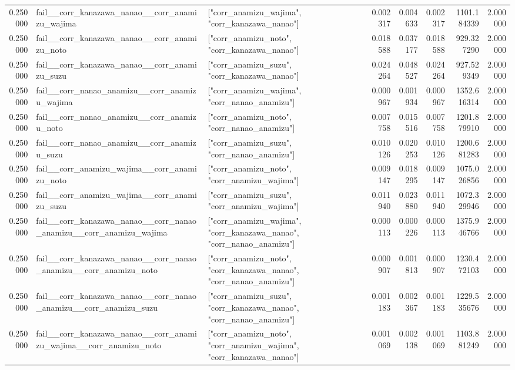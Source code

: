 \begin{tabular}{rllrrrrr}
0.250000 & fail\_\_corr\_kanazawa\_nanao\_\_corr\_anamizu\_wajima & ["corr\_anamizu\_wajima", "corr\_kanazawa\_nanao"] & 0.002317 & 0.004633 & 0.002317 & 1101.184339 & 2.000000 \\
0.250000 & fail\_\_corr\_kanazawa\_nanao\_\_corr\_anamizu\_noto & ["corr\_anamizu\_noto", "corr\_kanazawa\_nanao"] & 0.018588 & 0.037177 & 0.018588 & 929.327290 & 2.000000 \\
0.250000 & fail\_\_corr\_kanazawa\_nanao\_\_corr\_anamizu\_suzu & ["corr\_anamizu\_suzu", "corr\_kanazawa\_nanao"] & 0.024264 & 0.048527 & 0.024264 & 927.529349 & 2.000000 \\
0.250000 & fail\_\_corr\_nanao\_anamizu\_\_corr\_anamizu\_wajima & ["corr\_anamizu\_wajima", "corr\_nanao\_anamizu"] & 0.000967 & 0.001934 & 0.000967 & 1352.616314 & 2.000000 \\
0.250000 & fail\_\_corr\_nanao\_anamizu\_\_corr\_anamizu\_noto & ["corr\_anamizu\_noto", "corr\_nanao\_anamizu"] & 0.007758 & 0.015516 & 0.007758 & 1201.879910 & 2.000000 \\
0.250000 & fail\_\_corr\_nanao\_anamizu\_\_corr\_anamizu\_suzu & ["corr\_anamizu\_suzu", "corr\_nanao\_anamizu"] & 0.010126 & 0.020253 & 0.010126 & 1200.681283 & 2.000000 \\
0.250000 & fail\_\_corr\_anamizu\_wajima\_\_corr\_anamizu\_noto & ["corr\_anamizu\_noto", "corr\_anamizu\_wajima"] & 0.009147 & 0.018295 & 0.009147 & 1075.026856 & 2.000000 \\
0.250000 & fail\_\_corr\_anamizu\_wajima\_\_corr\_anamizu\_suzu & ["corr\_anamizu\_suzu", "corr\_anamizu\_wajima"] & 0.011940 & 0.023880 & 0.011940 & 1072.329946 & 2.000000 \\
0.250000 & fail\_\_corr\_kanazawa\_nanao\_\_corr\_nanao\_anamizu\_\_corr\_anamizu\_wajima & ["corr\_anamizu\_wajima", "corr\_kanazawa\_nanao", "corr\_nanao\_anamizu"] & 0.000113 & 0.000226 & 0.000113 & 1375.946766 & 2.000000 \\
0.250000 & fail\_\_corr\_kanazawa\_nanao\_\_corr\_nanao\_anamizu\_\_corr\_anamizu\_noto & ["corr\_anamizu\_noto", "corr\_kanazawa\_nanao", "corr\_nanao\_anamizu"] & 0.000907 & 0.001813 & 0.000907 & 1230.472103 & 2.000000 \\
0.250000 & fail\_\_corr\_kanazawa\_nanao\_\_corr\_nanao\_anamizu\_\_corr\_anamizu\_suzu & ["corr\_anamizu\_suzu", "corr\_kanazawa\_nanao", "corr\_nanao\_anamizu"] & 0.001183 & 0.002367 & 0.001183 & 1229.535676 & 2.000000 \\
0.250000 & fail\_\_corr\_kanazawa\_nanao\_\_corr\_anamizu\_wajima\_\_corr\_anamizu\_noto & ["corr\_anamizu\_noto", "corr\_anamizu\_wajima", "corr\_kanazawa\_nanao"] & 0.001069 & 0.002138 & 0.001069 & 1103.881249 & 2.000000 \\

\end{tabular}
